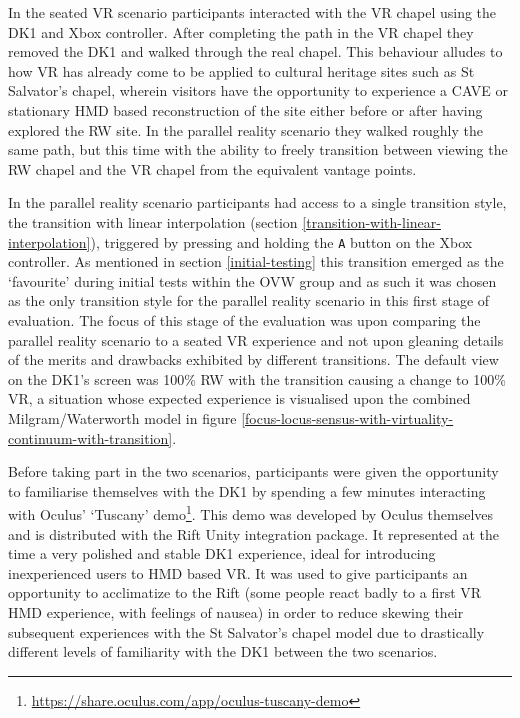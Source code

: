 In the seated VR scenario participants interacted with the VR chapel using the DK1 and Xbox controller. After completing the path in the VR chapel they removed the DK1 and walked through the real chapel. This behaviour alludes to how VR has already come to be applied to cultural heritage sites such as St Salvator's chapel, wherein visitors have the opportunity to experience a CAVE or stationary HMD based reconstruction of the site either before or after having explored the RW site. In the parallel reality scenario they walked roughly the same path, but this time with the ability to freely transition between viewing the RW chapel and the VR chapel from the equivalent vantage points.

In the parallel reality scenario participants had access to a single transition style, the transition with linear interpolation (section \ref{transition-with-linear-interpolation}), triggered by pressing and holding the \texttt{A} button on the Xbox controller. As mentioned in section \ref{initial-testing} this transition emerged as the `favourite' during initial tests within the OVW group and as such it was chosen as the only transition style for the parallel reality scenario in this first stage of evaluation. The focus of this stage of the evaluation was upon comparing the parallel reality scenario to a seated VR experience and not upon gleaning details of the merits and drawbacks exhibited by different transitions. The default view on the DK1's screen was 100\% RW with the transition causing a change to 100\% VR, a situation whose expected experience is visualised upon the combined Milgram/Waterworth model in figure \ref{focus-locus-sensus-with-virtuality-continuum-with-transition}.

Before taking part in the two scenarios, participants were given the opportunity to familiarise themselves with the DK1 by spending a few minutes interacting with Oculus' `Tuscany' demo\footnote{\url{https://share.oculus.com/app/oculus-tuscany-demo}}. This demo was developed by Oculus themselves and is distributed with the Rift Unity integration package. It represented at the time a very polished and stable DK1 experience, ideal for introducing inexperienced users to HMD based VR. It was used to give participants an opportunity to acclimatize to the Rift (some people react badly to a first VR HMD experience, with feelings of nausea) in order to reduce skewing their subsequent experiences with the St Salvator's chapel model due to drastically different levels of familiarity with the DK1 between the two scenarios.

